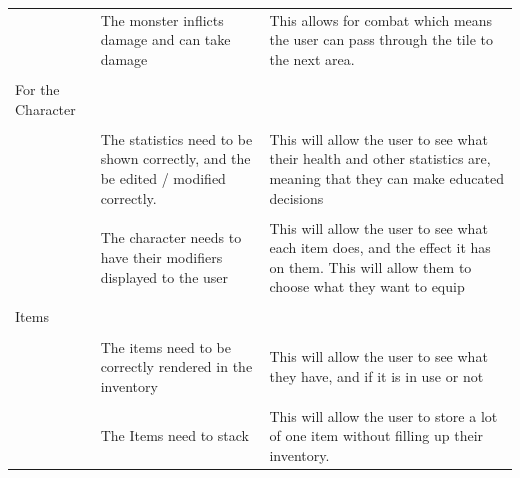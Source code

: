 \documentclass[12pt]{article}
\begin{document}
\begin{tabularx}{\linewidth}{XXX}
                        & The monster inflicts damage and can take damage                                                    & This allows for combat which means the user can pass through the tile to the next area.                                                                                                                                                            \\\\
For the Character       &                                                                                                    &                                                                                                                                                                                                                                                    \\\\
                        & The statistics need to be shown correctly, and the be edited / modified correctly.                 & This will allow the user to see what their health and other statistics are, meaning that they can make educated decisions                                                                                                                          \\\\
                        & The character needs to have their modifiers displayed to the user                                  & This will allow the user to see what each item does, and the effect it has on them. This will allow them to choose what they want to equip                                                                                                        \\\\
Items                   &                                                                                                    &                                                                                                                                                                                                                                                    \\\\
                        & The items need to be correctly rendered in the inventory                                           & This will allow the user to see what they have, and if it is in use or not                                                                                                                                                                         \\\\
                        & The Items need to stack                                                                            & This will allow the user to store a lot of one item without filling up their inventory.
\end{tabularx}
\end{document}

